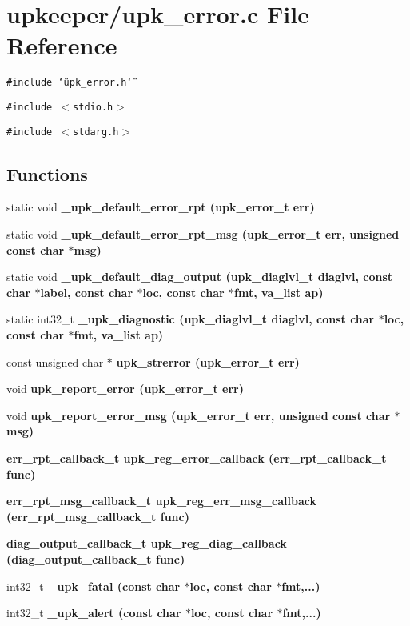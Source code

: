 \section{upkeeper/upk\_\-error.c File Reference}
\label{upk__error_8c}
{\tt \#include \char`\"{}upk\_\-error.h\char`\"{}}\par
{\tt \#include $<$stdio.h$>$}\par
{\tt \#include $<$stdarg.h$>$}\par
\subsection*{Functions}
\begin{CompactItemize}
\item 
static void \bf{\_\-upk\_\-default\_\-error\_\-rpt} (\bf{upk\_\-error\_\-t} err)
\item 
static void \bf{\_\-upk\_\-default\_\-error\_\-rpt\_\-msg} (\bf{upk\_\-error\_\-t} err, unsigned const char $\ast$msg)
\item 
static void \bf{\_\-upk\_\-default\_\-diag\_\-output} (\bf{upk\_\-diaglvl\_\-t} diaglvl, const char $\ast$label, const char $\ast$loc, const char $\ast$fmt, va\_\-list ap)
\item 
static int32\_\-t \bf{\_\-upk\_\-diagnostic} (\bf{upk\_\-diaglvl\_\-t} diaglvl, const char $\ast$loc, const char $\ast$fmt, va\_\-list ap)
\item 
const unsigned char $\ast$ \bf{upk\_\-strerror} (\bf{upk\_\-error\_\-t} err)
\item 
void \bf{upk\_\-report\_\-error} (\bf{upk\_\-error\_\-t} err)
\item 
void \bf{upk\_\-report\_\-error\_\-msg} (\bf{upk\_\-error\_\-t} err, unsigned const char $\ast$msg)
\item 
\bf{err\_\-rpt\_\-callback\_\-t} \bf{upk\_\-reg\_\-error\_\-callback} (\bf{err\_\-rpt\_\-callback\_\-t} func)
\item 
\bf{err\_\-rpt\_\-msg\_\-callback\_\-t} \bf{upk\_\-reg\_\-err\_\-msg\_\-callback} (\bf{err\_\-rpt\_\-msg\_\-callback\_\-t} func)
\item 
\bf{diag\_\-output\_\-callback\_\-t} \bf{upk\_\-reg\_\-diag\_\-callback} (\bf{diag\_\-output\_\-callback\_\-t} func)
\item 
int32\_\-t \bf{\_\-upk\_\-fatal} (const char $\ast$loc, const char $\ast$fmt,...)
\item 
int32\_\-t \bf{\_\-upk\_\-alert} (const char $\ast$loc, const char $\ast$fmt,...)

\end{CompactItemize}
